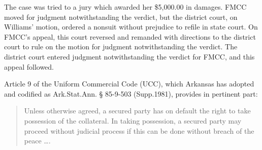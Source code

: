 The case was tried to a jury which awarded her \$5,000.00 in damages. FMCC moved
for judgment notwithstanding the verdict, but the district court, on Williams'
motion, ordered a nonsuit without prejudice to refile in state court. On FMCC's
appeal, this court reversed and remanded with directions to the district court
to rule on the motion for judgment notwithstanding the verdict. The district
court entered judgment notwithstanding the verdict for FMCC, and this appeal
followed.

Article 9 of the Uniform Commercial Code (UCC), which Arkansas has adopted and
codified as Ark.Stat.Ann. {\S} 85-9-503 (Supp.1981), provides in pertinent
part:
\begin{quote}
Unless otherwise agreed, a secured party has on default the right to take
possession of the collateral. In taking possession, a secured party may proceed
without judicial process if this can be done without breach of the peace
\ldots.
\end{quote}

